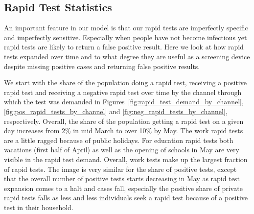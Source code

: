 \subsection{Rapid Test Statistics}
\label{subsec:results_rapid_test_statistics}

An important feature in our model is that our rapid tests are imperfectly specific and
imperfectly sensitive. Especially when people have not become infectious yet rapid tests
are likely to return a false positive result. Here we look at how rapid tests expanded
over time and to what degree they are useful as a screening device despite missing
positive cases and returning false positive results.

We start with the share of the population doing a rapid test, receiving a positive rapid
test and receiving a negative rapid test over time by the channel through which the test
was demanded in Figures~\ref{fig:rapid_test_demand_by_channel},
\ref{fig:pos_rapid_tests_by_channel} and \ref{fig:neg_rapid_tests_by_channel},
respectively. Overall, the share of the population getting a rapid test on a given day
increases from 2\% in mid March to over 10\% by May. The work rapid tests are a little
ragged because of public holidays. For education rapid tests both vacations (first half
of April) as well as the opening of schools in May are very visible in the rapid test
demand. Overall, work tests make up the largest fraction of rapid tests. The image is
very similar for the share of positive tests, except that the overall number of positive
tests starts decreasing in May as rapid test expansion comes to a halt and cases fall,
especially the positive share of private rapid tests falls as less and less individuals
seek a rapid test because of a positive test in their household.

